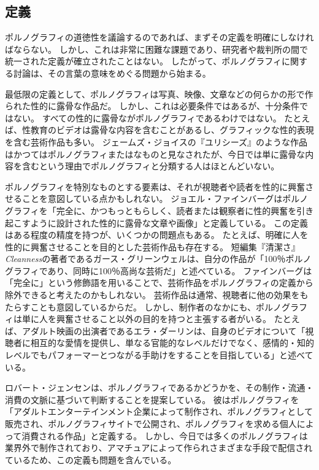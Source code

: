 \documentclass[paper=a4,book,openany]{jlreq} \usepackage{mystyle}
\begin{document}
\subsection{定義}

ポルノグラフィの道徳性を議論するのであれば、まずその定義を明確にしなければならない。
しかし、これは非常に困難な課題であり、研究者や裁判所の間で統一された定義が確立されたことはない。
したがって、ポルノグラフィに関する討論は、その言葉の意味をめぐる問題から始まる。

最低限の定義として、ポルノグラフィは写真、映像、文章などの何らかの形で作られた性的に露骨な作品だ。
しかし、これは必要条件ではあるが、十分条件ではない。
すべての性的に露骨ながポルノグラフィであるわけではない。
たとえば、性教育のビデオは露骨な内容を含むことがあるし、グラフィックな性的表現を含む芸術作品も多い。
ジェームズ・ジョイスの『ユリシーズ』のような作品はかつてはポルノグラフィまたはなものと見なされたが、今日では単に露骨な内容を含むという理由でポルノグラフィと分類する人はほとんどいない。

ポルノグラフィを特別なものとする要素は、それが視聴者や読者を性的に興奮させることを意図している点かもしれない。
ジョエル・ファインバーグはポルノグラフィを「完全に、かつもっともらしく、読者または観察者に性的興奮を引き起こすように設計された性的に露骨な文章や画像」と定義している\citep[p.127]{feinberg85:_offen_to_other}。
この定義はある程度の精度を持つが、いくつかの問題点もある。
たとえば、明確に人を性的に興奮させることを目的とした芸術作品も存在する。
短編集『清潔さ』\emph{Cleanness}の著者であるガース・グリーンウェルは、自分の作品が「100％ポルノグラフィであり、同時に100％高尚な芸術だ」と述べている\citep{barone20:_garth_green_comes_clean}。
ファインバーグは「完全に」という修飾語を用いることで、芸術作品をポルノグラフィの定義から除外できると考えたのかもしれない。
芸術作品は通常、視聴者に他の効果をもたらすことも意図しているからだ。
しかし、制作者のなかにも、ポルノグラフィは単に人を興奮させること以外の目的を持つと主張する者がいる。
たとえば、アダルト映画の出演者であるエラ・ダーリンは、自身のビデオについて「視聴者に相互的な愛情を提供し、単なる官能的なレベルだけでなく、感情的・知的レベルでもパフォーマーとつながる手助けをすることを目指している」と述べている\citep{bell19:_women_are_leadin_porns_lates_reinv}。

ロバート・ジェンセンは、ポルノグラフィであるかどうかを、その制作・流通・消費の文脈に基づいて判断することを提案している。
彼はポルノグラフィを「アダルトエンターテインメント企業によって制作され、ポルノグラフィとして販売され、ポルノグラフィサイトで公開され、ポルノグラフィを求める個人によって消費される作品」と定義する\citep[p.53]{jensen07:gettingoff}。
しかし、今日では多くのポルノグラフィは業界外で制作されており、アマチュアによって作られさまざまな手段で配信されているため、この定義も問題を含んでいる。
\end{document}
